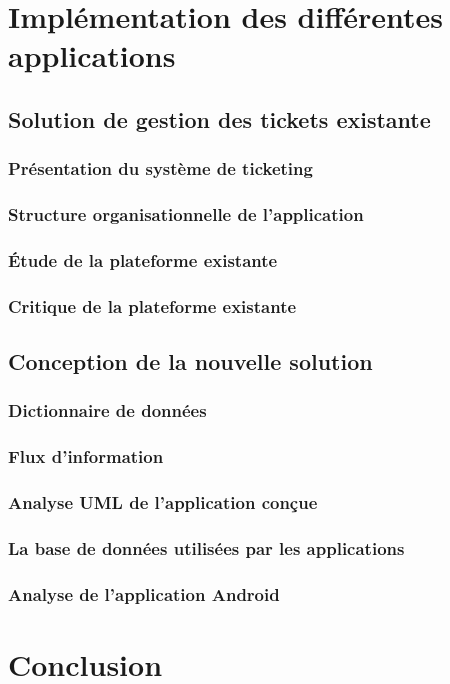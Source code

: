 \documentclass{report}
\begin{document}
\chapter{Implémentation des différentes applications}

\section{Solution de gestion des tickets existante}

\subsection{Présentation du système de ticketing}

\subsection{Structure organisationnelle de l'application}

\subsection{Étude de la plateforme existante}

\subsection{Critique de la plateforme existante}

\section{Conception de la nouvelle solution}

\subsection{Dictionnaire de données}

\subsection{Flux d'information}

\subsection{Analyse UML de l'application conçue}

\subsection{La base de données utilisées par les applications}

\subsection{Analyse de l'application Android}

\chapter{Conclusion}
\end{document}
